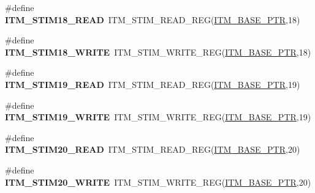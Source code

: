 \begin{DoxyCompactItemize}
\item 
\hypertarget{group___i_t_m___register___accessor___macros_ga4d40ae88921303412c9628a350572a8a}{}\#define {\bfseries I\+T\+M\+\_\+\+S\+T\+I\+M18\+\_\+\+R\+E\+A\+D}~I\+T\+M\+\_\+\+S\+T\+I\+M\+\_\+\+R\+E\+A\+D\+\_\+\+R\+E\+G(\hyperlink{group___i_t_m___peripheral_gafaddee8fe8b6a898d4e5edc43ee0d703}{I\+T\+M\+\_\+\+B\+A\+S\+E\+\_\+\+P\+T\+R},18)\label{group___i_t_m___register___accessor___macros_ga4d40ae88921303412c9628a350572a8a}

\item 
\hypertarget{group___i_t_m___register___accessor___macros_ga1fb39bc1a36c6aed07b8588d2d1c77b0}{}\#define {\bfseries I\+T\+M\+\_\+\+S\+T\+I\+M18\+\_\+\+W\+R\+I\+T\+E}~I\+T\+M\+\_\+\+S\+T\+I\+M\+\_\+\+W\+R\+I\+T\+E\+\_\+\+R\+E\+G(\hyperlink{group___i_t_m___peripheral_gafaddee8fe8b6a898d4e5edc43ee0d703}{I\+T\+M\+\_\+\+B\+A\+S\+E\+\_\+\+P\+T\+R},18)\label{group___i_t_m___register___accessor___macros_ga1fb39bc1a36c6aed07b8588d2d1c77b0}

\item 
\hypertarget{group___i_t_m___register___accessor___macros_gaae6a230f21e1fb36ab999e662677ac65}{}\#define {\bfseries I\+T\+M\+\_\+\+S\+T\+I\+M19\+\_\+\+R\+E\+A\+D}~I\+T\+M\+\_\+\+S\+T\+I\+M\+\_\+\+R\+E\+A\+D\+\_\+\+R\+E\+G(\hyperlink{group___i_t_m___peripheral_gafaddee8fe8b6a898d4e5edc43ee0d703}{I\+T\+M\+\_\+\+B\+A\+S\+E\+\_\+\+P\+T\+R},19)\label{group___i_t_m___register___accessor___macros_gaae6a230f21e1fb36ab999e662677ac65}

\item 
\hypertarget{group___i_t_m___register___accessor___macros_ga0dcaa81a5a092538e5d2184087988886}{}\#define {\bfseries I\+T\+M\+\_\+\+S\+T\+I\+M19\+\_\+\+W\+R\+I\+T\+E}~I\+T\+M\+\_\+\+S\+T\+I\+M\+\_\+\+W\+R\+I\+T\+E\+\_\+\+R\+E\+G(\hyperlink{group___i_t_m___peripheral_gafaddee8fe8b6a898d4e5edc43ee0d703}{I\+T\+M\+\_\+\+B\+A\+S\+E\+\_\+\+P\+T\+R},19)\label{group___i_t_m___register___accessor___macros_ga0dcaa81a5a092538e5d2184087988886}

\item 
\hypertarget{group___i_t_m___register___accessor___macros_gaec08b7ed3a53bdd0c49f608929a323ed}{}\#define {\bfseries I\+T\+M\+\_\+\+S\+T\+I\+M20\+\_\+\+R\+E\+A\+D}~I\+T\+M\+\_\+\+S\+T\+I\+M\+\_\+\+R\+E\+A\+D\+\_\+\+R\+E\+G(\hyperlink{group___i_t_m___peripheral_gafaddee8fe8b6a898d4e5edc43ee0d703}{I\+T\+M\+\_\+\+B\+A\+S\+E\+\_\+\+P\+T\+R},20)\label{group___i_t_m___register___accessor___macros_gaec08b7ed3a53bdd0c49f608929a323ed}

\item 
\hypertarget{group___i_t_m___register___accessor___macros_ga1e109dc4eb08a82ad21ba29f64b02976}{}\#define {\bfseries I\+T\+M\+\_\+\+S\+T\+I\+M20\+\_\+\+W\+R\+I\+T\+E}~I\+T\+M\+\_\+\+S\+T\+I\+M\+\_\+\+W\+R\+I\+T\+E\+\_\+\+R\+E\+G(\hyperlink{group___i_t_m___peripheral_gafaddee8fe8b6a898d4e5edc43ee0d703}{I\+T\+M\+\_\+\+B\+A\+S\+E\+\_\+\+P\+T\+R},20)\label{group___i_t_m___register___accessor___macros_ga1e109dc4eb08a82ad21ba29f64b02976}


\end{DoxyCompactItemize}
